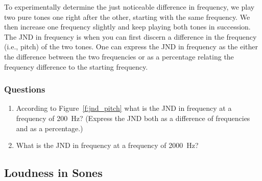 \documentclass[11pt]{NSF}
\def\ben{\begin{enumerate}}
\def\een{\end{enumerate}}
\begin{document}
To experimentally determine the just noticeable difference in
frequency, we play two pure tones one right after the other,
starting with the same frequency. 
We then increase one frequency slightly and keep playing both tones 
in succession.
The JND in frequency is when you can first discern a difference in 
the frequency (i.e., pitch) of the two tones.
One can express the JND in frequency as the either the 
difference between the two frequencies or as a percentage relating
the frequency difference to the starting frequency.

\subsubsection*{Questions}
\ben
\item 
According to Figure~\ref{f:jnd_pitch} what is the JND in frequency
at a frequency of 200~Hz?
(Express the JND both as a difference of frequencies and as a 
percentage.)

\item What is the JND in frequency at a frequency of 2000~Hz?
\een

\subsection{Loudness in Sones}
\end{document}
